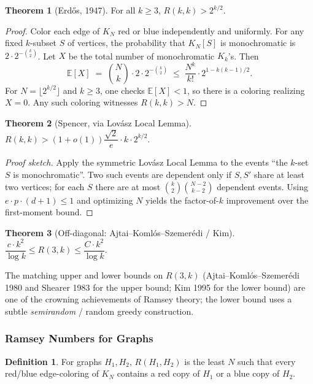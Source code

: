 \documentclass{article}
\theoremstyle{definition}
\newtheorem{theorem}{Theorem}
\newtheorem{definition}{Definition}
\begin{document}
\begin{theorem}[Erd\H{o}s, 1947]\label{thm:erdos-ramsey}
For all $k \ge 3$, $R(k, k) > 2^{k/2}$.
\end{theorem}

\begin{proof}
Color each edge of $K_N$ red or blue independently and uniformly.
For any fixed $k$-subset $S$ of vertices, the probability that
$K_N[S]$ is monochromatic is $2 \cdot 2^{-\binom{k}{2}}$. Let $X$
be the total number of monochromatic $K_k$'s. Then
\[
  \mathbb{E}[X] \;=\; \binom{N}{k} \cdot 2 \cdot 2^{-\binom{k}{2}}
  \;\le\; \frac{N^k}{k!} \cdot 2^{1 - k(k-1)/2}.
\]
For $N = \lfloor 2^{k/2} \rfloor$ and $k \ge 3$, one checks
$\mathbb{E}[X] < 1$, so there is a coloring realizing $X = 0$. Any
such coloring witnesses $R(k, k) > N$.
\end{proof}

\begin{theorem}[Spencer, via Lovász Local Lemma]\label{thm:spencer-lll}
$R(k, k) > (1 + o(1))\dfrac{\sqrt{2}}{e} \cdot k \cdot 2^{k/2}$.
\end{theorem}

\begin{proof}[Proof sketch]
Apply the symmetric Lovász Local Lemma to the events ``the $k$-set
$S$ is monochromatic''. Two such events are dependent only if $S, S'$
share at least two vertices; for each $S$ there are at most
$\binom{k}{2}\binom{N - 2}{k - 2}$ dependent events. Using
$e \cdot p \cdot (d + 1) \le 1$ and optimizing $N$ yields the factor-of-$k$
improvement over the first-moment bound.
\end{proof}

\begin{theorem}[Off-diagonal: Ajtai--Koml\'os--Szemer\'edi / Kim]
$\dfrac{c \cdot k^2}{\log k} \le R(3, k) \le \dfrac{C \cdot k^2}{\log k}$.
\end{theorem}

The matching upper and lower bounds on $R(3, k)$ (Ajtai--Koml\'os--Szemer\'edi
1980 and Shearer 1983 for the upper bound; Kim 1995 for the lower bound)
are one of the crowning achievements of Ramsey theory; the
lower bound uses a subtle \emph{semirandom} / random greedy
construction.

\subsubsection{Ramsey Numbers for Graphs}

\begin{definition}
For graphs $H_1, H_2$, $R(H_1, H_2)$ is the least $N$ such that every
red/blue edge-coloring of $K_N$ contains a red copy of $H_1$ or a
blue copy of $H_2$.
\end{definition}
\end{document}
